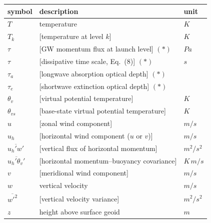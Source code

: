 \documentclass[draft]{agujournal2019}
\begin{document}
\newpage

 \begin{tabular}{l l l}
  \hline
 symbol & description & unit \\
 \hline  \hline
  $T$ & temperature & $K$\\
  $T_k$ & [temperature at level $k$] & $K$\\
  $\tau$ & [GW momentum flux at launch level] $(*)$ & $Pa$\\
  $\tau$ & [dissipative time scale, Eq.~(8)] $(*)$ & $s$\\
  $\tau_a$ & [longwave absorption optical depth] $(*)$ & \\
  $\tau_e$ & [shortwave extinction optical depth] $(*)$ & \\
  $\theta_v$ & [virtual potential temperature] & $K$\\
  $\theta_{vs}$ & [base-state virtual potential temperature] & $K$\\
  $u$ & [zonal wind component] & $m/s$\\
  $u_h$ & [horizontal wind component ($u$ or $v$)] & $m/s$\\
  $\overline{u_h'w'}$ & [vertical flux of horizontal momentum] & $m^2/s^2$\\
  $\overline{u_h'\theta_v'}$ & [horizontal momentum--buoyancy covariance] & $K\,m/s$\\
  $v$ & [meridional wind component] & $m/s$\\
  $w$ & vertical velocity & $m/s$\\
  $\overline{w'^2}$ & [vertical velocity variance] & $m^2/s^2$\\
  $z$ & height above surface geoid & $m$\\
 \hline
 \hline
 \end{tabular}
\end{document}
